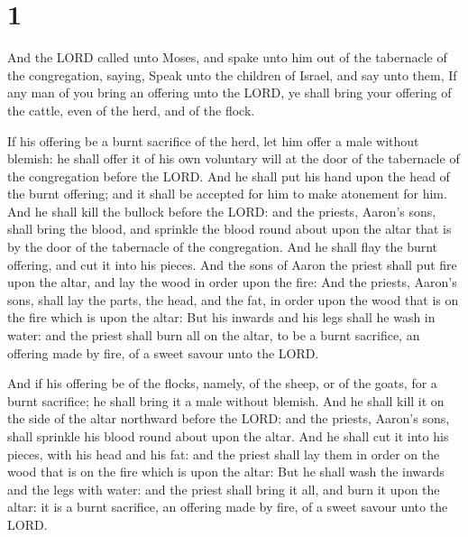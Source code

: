 \hypertarget{section}{%
\section{1}\label{section}}

 And the LORD called unto Moses, and spake unto him out of
the tabernacle of the congregation, saying,  Speak unto the
children of Israel, and say unto them, If any man of you bring an
offering unto the LORD, ye shall bring your offering of the cattle, even
of the herd, and of the flock.

 If his offering be a burnt sacrifice of the herd, let him
offer a male without blemish: he shall offer it of his own voluntary
will at the door of the tabernacle of the congregation before the LORD.
 And he shall put his hand upon the head of the burnt
offering; and it shall be accepted for him to make atonement for him.
 And he shall kill the bullock before the LORD: and the
priests, Aaron's sons, shall bring the blood, and sprinkle the blood
round about upon the altar that is by the door of the tabernacle of the
congregation.  And he shall flay the burnt offering, and cut
it into his pieces.  And the sons of Aaron the priest shall
put fire upon the altar, and lay the wood in order upon the fire:
 And the priests, Aaron's sons, shall lay the parts, the
head, and the fat, in order upon the wood that is on the fire which is
upon the altar:  But his inwards and his legs shall he wash
in water: and the priest shall burn all on the altar, to be a burnt
sacrifice, an offering made by fire, of a sweet savour unto the LORD.

 And if his offering be of the flocks, namely, of the
sheep, or of the goats, for a burnt sacrifice; he shall bring it a male
without blemish.  And he shall kill it on the side of the
altar northward before the LORD: and the priests, Aaron's sons, shall
sprinkle his blood round about upon the altar.  And he
shall cut it into his pieces, with his head and his fat: and the priest
shall lay them in order on the wood that is on the fire which is upon
the altar:  But he shall wash the inwards and the legs with
water: and the priest shall bring it all, and burn it upon the altar: it
is a burnt sacrifice, an offering made by fire, of a sweet savour unto
the LORD.

